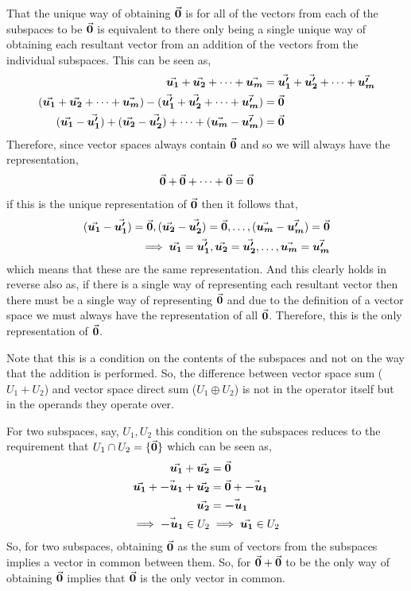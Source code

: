 \documentclass[MathsNotesBase.tex]{subfiles}
\begin{document}
{		\bigskip
		
		\medskip
		That the unique way of obtaining $\vec{\bm{0}}$ is for all of the vectors from each of the subspaces to be $\vec{\bm{0}}$ is equivalent to there only being a single unique way of obtaining each resultant vector from an addition of the vectors from the individual subspaces. This can be seen as,
		\begin{align*}
		\vec{\bm{u_1}} + \vec{\bm{u_2}} + \dots + \vec{\bm{u_m}} &= \vec{\bm{u_1'}} + \vec{\bm{u_2'}} + \dots + \vec{\bm{u_m'}}\\
		(\vec{\bm{u_1}} + \vec{\bm{u_2}} + \dots + \vec{\bm{u_m}}) - (\vec{\bm{u_1'}} + \vec{\bm{u_2'}} + \dots + \vec{\bm{u_m'}}) &= \vec{\bm{0}}\\
		(\vec{\bm{u_1}} - \vec{\bm{u_1'}}) + (\vec{\bm{u_2}} - \vec{\bm{u_2'}}) + \dots + (\vec{\bm{u_m}} - \vec{\bm{u_m'}}) &= \vec{\bm{0}}
		\end{align*}
		Therefore, since vector spaces always contain $\vec{\bm{0}}$ and so we will always have the representation,
		\[ \vec{\bm{0}} + \vec{\bm{0}} + \dots + \vec{\bm{0}} = \vec{\bm{0}} \]
		if this is the unique representation of $\vec{\bm{0}}$ then it follows that,
		\begin{align*}
		(\vec{\bm{u_1}} - \vec{\bm{u_1'}}) = \vec{\bm{0}}, (\vec{\bm{u_2}} - \vec{\bm{u_2'}}) = \vec{\bm{0}}, \dots, (\vec{\bm{u_m}} - \vec{\bm{u_m'}}) = \vec{\bm{0}} \\
		\implies \vec{\bm{u_1}} = \vec{\bm{u_1'}}, \vec{\bm{u_2}} = \vec{\bm{u_2'}}, \dots, \vec{\bm{u_m}} = \vec{\bm{u_m'}}
		\end{align*}
		which means that these are the same representation. And this clearly holds in reverse also as, if there is a single way of representing each resultant vector then there must be a single way of representing $\vec{\bm{0}}$ and due to the definition of a vector space we must always have the representation of all $\vec{\bm{0}}$. Therefore, this is the only representation of $\vec{\bm{0}}$.
		
		Note that this is a condition on the contents of the subspaces and not on the way that the addition is performed. So, the difference between vector space sum ($U_1 + U_2$) and vector space direct sum ($U_1 \oplus U_2$) is not in the operator itself but in the operands they operate over.
		
		For two subspaces, say, $U_1, U_2$ this condition on the subspaces reduces to the requirement that $U_1 \cap U_2 = \{\vec{\bm{0}}\}$ which can be seen as,
		\begin{align*}
		\vec{\bm{u_1}} + \vec{\bm{u_2}} &= \vec{\bm{0}}\\
		\vec{\bm{u_1}} + \vec{\bm{-u_1}} + \vec{\bm{u_2}} &= \vec{\bm{0}} + \vec{\bm{-u_1}}\\
		\vec{\bm{u_2}} &= \vec{\bm{-u_1}}\\
		\implies \vec{\bm{-u_1}} \in U_2 &\implies \vec{\bm{u_1}} \in U_2
		\end{align*}
		So, for two subspaces, obtaining $\vec{\bm{0}}$ as the sum of vectors from the subspaces implies a vector in common between them. So, for $\vec{\bm{0}} + \vec{\bm{0}}$ to be the only way of obtaining $\vec{\bm{0}}$ implies that $\vec{\bm{0}}$ is the only vector in common.
		
}
\end{document}
